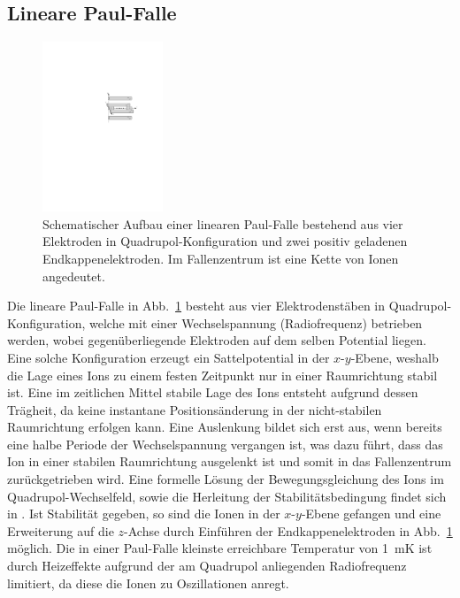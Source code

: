 \documentclass[twocolumn]{revtex4}
\begin{document}
\subsection{Lineare Paul-Falle}
\begin{figure}[h]
	\vspace{-0.2cm}
	\centering
	\includegraphics[width=0.32\textwidth]{./figures/lineare_paulfalle.pdf}
	\caption{Schematischer Aufbau einer linearen Paul-Falle  bestehend aus vier Elektroden in Quadrupol-Konfiguration und zwei positiv geladenen Endkappenelektroden. Im Fallenzentrum ist eine Kette von Ionen angedeutet.}
	\label{fig:paulfalle}
\end{figure}
Die lineare Paul-Falle in Abb.~\ref{fig:paulfalle} besteht aus vier Elektrodenstäben in Quadrupol-Konfiguration, welche mit einer Wechselspannung (Radiofrequenz) betrieben werden, wobei gegenüberliegende Elektroden auf dem selben Potential liegen.
Eine solche Konfiguration erzeugt ein Sattelpotential in der $x$-$y$-Ebene, weshalb die Lage eines Ions zu einem festen Zeitpunkt nur in einer Raumrichtung stabil ist.
Eine im zeitlichen Mittel stabile Lage des Ions entsteht aufgrund dessen Trägheit, da keine instantane Positionsänderung in der nicht-stabilen Raumrichtung erfolgen kann.
Eine Auslenkung bildet sich erst aus, wenn bereits eine halbe Periode der Wechselspannung vergangen ist, was dazu führt, dass das Ion in einer stabilen Raumrichtung ausgelenkt ist und somit in das Fallenzentrum zurückgetrieben wird.
Eine formelle Lösung der Bewegungsgleichung des Ions im Quadrupol-Wechselfeld, sowie die Herleitung der Stabilitätsbedingung findet sich in \cite{foot}.
Ist Stabilität gegeben, so sind die Ionen in der $x$-$y$-Ebene gefangen und eine Erweiterung auf die $z$-Achse durch Einführen der Endkappenelektroden in Abb.~\ref{fig:paulfalle} möglich.
Die in einer Paul-Falle kleinste erreichbare Temperatur von \SI{1}{mK} ist durch Heizeffekte aufgrund der am Quadrupol anliegenden Radiofrequenz limitiert, da diese die Ionen zu Oszillationen anregt.
\end{document}
